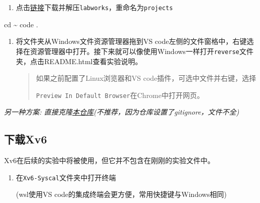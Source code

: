 \documentclass[
]{article}
\newenvironment{Shaded}{}{}
\newcommand{\BuiltInTok}[1]{\textcolor[rgb]{0.00,0.50,0.00}{#1}}
\newcommand{\ExtensionTok}[1]{#1}
\newcommand{\NormalTok}[1]{#1}
\begin{document}
\begin{enumerate}
  \def\labelenumi{\arabic{enumi}.}
  \item
        点击\href{https://seunic-my.sharepoint.cn/personal/101011912_seu_edu_cn/_layouts/15/onedrive.aspx?id=/personal/101011912_seu_edu_cn/Documents/教学/Teaching/操作系统/OSC_labs/Xv6.labworks.7z&parent=/personal/101011912_seu_edu_cn/Documents/教学/Teaching/操作系统/OSC_labs}{链接}下载并解压\texttt{labworks}，重命名为\texttt{projects}
\end{enumerate}

\begin{Shaded}
  \begin{Highlighting}[]
    \BuiltInTok{cd}\NormalTok{ \textasciitilde{}}
    \ExtensionTok{code}\NormalTok{ .}
  \end{Highlighting}
\end{Shaded}

\begin{enumerate}
  \def\labelenumi{\arabic{enumi}.}
  \item
        将文件夹从Windows文件资源管理器拖到VS
        code左侧的文件窗格中，右键选择在资源管理器中打开。接下来就可以像使用Windows一样打开\texttt{reverse}文件夹，点击README.html查看实验说明。

        \begin{quote}
          如果之前配置了Linux浏览器和VS code插件，可选中文件并右键，选择

          \texttt{Preview\ In\ Default\ Browser}在Chrome中打开网页。
        \end{quote}
\end{enumerate}

\emph{另一种方案:
  直接克隆\href{https://github.com/julymiaw/Operating_System}{本仓库}(不推荐，因为仓库设置了gitignore，文件不全)}

\subsection{下载Xv6}\label{ux4e0bux8f7dxv6}

Xv6在后续的实验中将被使用，但它并不包含在刚刚的实验文件中。

\begin{enumerate}
  \def\labelenumi{\arabic{enumi}.}
  \item
        在\texttt{Xv6-Syscal}文件夹中打开终端

        (wsl使用VS code的集成终端会更方便，常用快捷键与Windows相同)
\end{enumerate}
\end{document}
